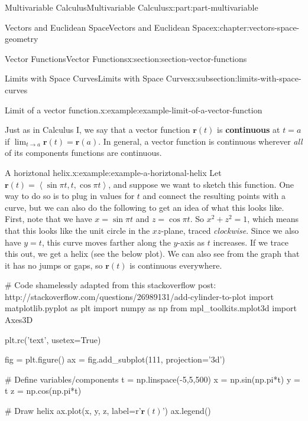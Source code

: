 \documentclass[twoside,10pt,]{tufte-book}
\newcommand{\terminology}[1]{\textbf{#1}}
\numberwithin{equation}{part}
\newcommand{\dotprod}[1]{\left\langle #1 \right\rangle}
\begin{document}
\begin{partptx}{Multivariable Calculus}{}{Multivariable Calculus}{}{}{x:part:part-multivariable}
\begin{chapterptx}{Vectors and Euclidean Space}{}{Vectors and Euclidean Space}{}{}{x:chapter:vectors-space-geometry}
\begin{sectionptx}{Vector Functions}{}{Vector Functions}{}{}{x:section:section-vector-functions}
\begin{subsectionptx}{Limits with Space Curves}{}{Limits with Space Curves}{}{}{x:subsection:limits-with-space-curves}
\begin{example}{Limit of a vector function.}{x:example:example-limit-of-a-vector-function}
\end{example}
Just as in Calculus I, we say that a vector function \(\mathbf{r}(t)\) is \terminology{continuous} at \(t=a\) if \(\lim_{t\to a}\mathbf{r}(t) = \mathbf{r}(a)\). In general, a vector function is continuous wherever \emph{all} of its components functions are continuous.%
\begin{example}{A horiztonal helix.}{x:example:example-a-horiztonal-helix}%
Let \(\mathbf{r}(t) = \dotprod{\sin\pi t, t, \cos\pi t}\), and suppose we want to sketch this function. One way to do so is to plug in values for \(t\) and connect the resulting points with a curve, but we can also do the following to get an idea of what this looks like. First, note that we have \(x = \sin\pi t\) and \(z=\cos\pi t\). So \(x^{2}+z^{2} = 1\), which means that this looks like the unit circle in the \(xz\)-plane, traced \emph{clockwise}. Since we also have \(y=t\), this curve moves farther along the \(y\)-axis as \(t\) increases. If we trace this out, we get a helix (see the below plot). We can also see from the graph that it has no jumps or gaps, so \(\mathbf{r}(t)\) is continuous everywhere.%
\end{example}
\begin{sageinput}
# Code shamelessly adapted from this stackoverflow post: http://stackoverflow.com/questions/26989131/add-cylinder-to-plot
import matplotlib.pyplot as plt
import numpy as np
from mpl_toolkits.mplot3d import Axes3D

plt.rc('text', usetex=True)

fig = plt.figure()
ax = fig.add_subplot(111, projection='3d')

# Define variables/components
t = np.linspace(-5,5,500)
x = np.sin(np.pi*t)
y = t
z = np.cos(np.pi*t)

# Draw helix
ax.plot(x, y, z, label=r'$\mathbf{r}(t)$')
ax.legend()


\end{sageinput}
\end{subsectionptx}
\end{sectionptx}
\end{chapterptx}
\end{partptx}
\end{document}
